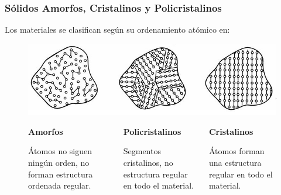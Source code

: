 \documentclass[10pt,t,aspectratio=169]{beamer}
\begin{document}
\begin{frame}[t]
\frametitle{Sólidos Amorfos, Cristalinos y Policristalinos}

Los materiales se clasifican según su ordenamiento atómico en:

\begin{figure}[H]
  \includegraphics[width=12cm]{./figures/cristalinidad.jpg}
  \begin{columns}
    \begin{column}[t]{3.6cm}
      \centering
      \textbf{Amorfos}

      Átomos no siguen ningún orden, no forman estructura ordenada regular.
    \end{column}
    \begin{column}[t]{3.6cm}
      \centering
      \textbf{Policristalinos}

      Segmentos cristalinos, no estructura regular en todo el  material.
    \end{column}
    \begin{column}[t]{3.6cm}
      \centering
      \textbf{Cristalinos}

      Átomos forman una estructura regular en todo el material.
    \end{column}
  \end{columns}
\end{figure}
\end{frame}
\end{document}

